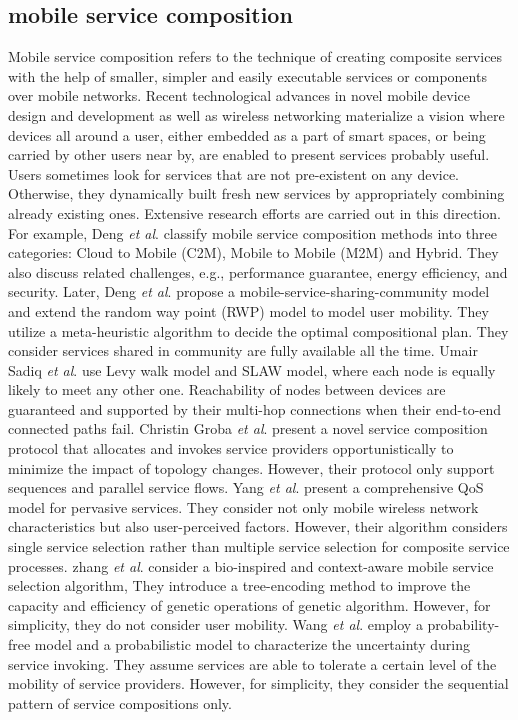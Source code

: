 \documentclass[journal]{IEEEtran}
\begin{document}
\subsection{mobile service composition}
Mobile service composition refers to the technique of creating composite services with the help of smaller, simpler and easily executable services or components over mobile networks. Recent technological advances in novel mobile device design and development as well as wireless networking materialize a vision where devices all around a user, either embedded as a part of smart spaces, or being carried by other users
near by, are enabled to present services probably useful. Users sometimes look for services that are not pre-existent on any device. Otherwise, they dynamically built fresh new services by appropriately combining already existing ones. Extensive research efforts are carried out in this direction. 
For example, Deng \emph{et al}. \cite{Deng2016} classify mobile service composition methods into three categories: Cloud to Mobile (C2M), Mobile to Mobile (M2M) and Hybrid. They also discuss related challenges, e.g., performance guarantee, energy efficiency, and security.
Later, Deng \emph{et al}. \cite{Deng2017} propose a mobile-service-sharing-community model and extend the random way point (RWP) model to model user mobility. They utilize a meta-heuristic algorithm to decide the optimal compositional plan. They consider services shared in community are fully available all the time.
Umair Sadiq \emph{et al}. \cite{sadiq2015service} use Levy walk model and SLAW model, where each node is equally likely to meet any other one. Reachability of nodes between devices are guaranteed and supported by their multi-hop connections when their end-to-end connected paths fail.
Christin Groba \emph{et al}. \cite{groba2014opportunistic} present a novel service composition protocol that allocates and invokes service providers opportunistically to minimize the impact of topology changes. However, their protocol only support sequences and parallel service flows.
Yang \emph{et al}. \cite{Yang2010} present a comprehensive QoS model for pervasive services. They consider not only mobile wireless network characteristics but also user-perceived factors. However, their algorithm considers single service selection rather than multiple service selection for composite service processes.
zhang \emph{et al}. \cite{Zhang2016qos} consider a bio-inspired and context-aware mobile service selection algorithm, They introduce a tree-encoding method to improve the capacity and efficiency of genetic operations of genetic algorithm. However, for simplicity, they do not consider user mobility.
Wang \emph{et al}. \cite{wang2011exploiting} employ a probability-free model and a probabilistic model to characterize the uncertainty during service invoking. They assume services are able to tolerate a certain level of the mobility of service providers. However, for simplicity, they consider the sequential pattern of service compositions only.
\end{document}
